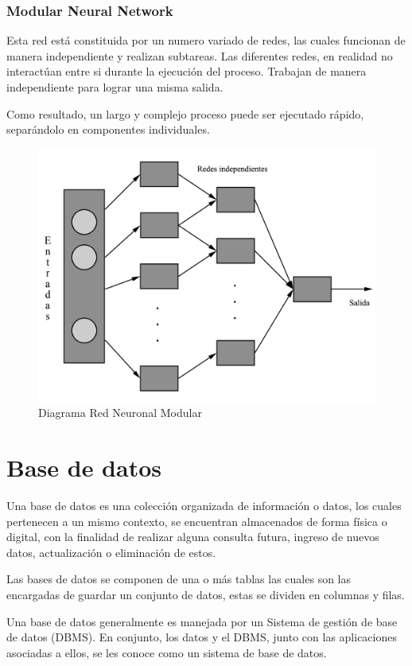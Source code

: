 \documentclass[12pt, a4paper, titlepage]{report}
\begin{document}
				\subsubsection{Modular Neural Network}
				Esta red está constituida por un numero variado de redes, las cuales funcionan de manera independiente y realizan subtareas. Las diferentes redes, en realidad no interactúan entre si durante la ejecución del proceso. Trabajan de manera independiente para lograr una misma salida.\par
				Como resultado, un largo y complejo proceso puede ser ejecutado rápido, separándolo en componentes individuales.\cite{refTiposRedesNeu2}\par
				\begin{figure}[H]
					\includegraphics[width=12cm]{./imagenes/MarcoTeorico/RedesN/Modular.png}
					\centering 
					\caption{Diagrama Red Neuronal Modular}
				\end{figure}
                

        \section{Base de datos}
        Una base de datos es una colección organizada de información o datos, los cuales pertenecen a un mismo contexto, se encuentran almacenados de forma física o digital, con la finalidad de realizar alguna consulta futura, ingreso de nuevos datos, actualización o eliminación de estos.\par
		Las bases de datos se componen de una o más tablas las cuales son las encargadas de guardar un conjunto de datos, estas se dividen en columnas y filas.\par
		Una base de datos generalmente es manejada por un \Gls{Sistema} de gestión de base de datos (DBMS). En conjunto, los datos y el DBMS, junto con las aplicaciones asociadas a ellos, se les conoce como un sistema de base de datos.\cite{refQueEsBD}\par
\end{document}
